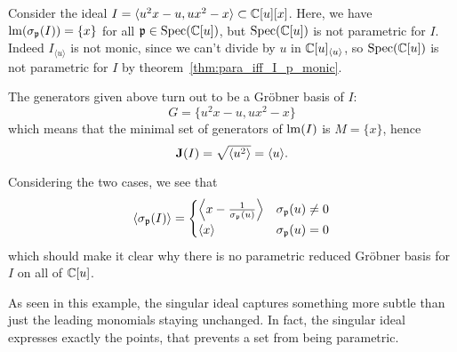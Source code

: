 \begin{example}\label{ex:u2x}\upshape
  Consider the ideal $I = \langle u^{2}x - u, ux^{2} - x \rangle \subset \mathbb{C}[u][x]$. Here, we have $\operatorname{lm}(\sigma_{\mathfrak p}(I)) = \{x\}$ for all $\mathfrak p \in \operatorname{Spec}(\mathbb{C}[u])$, but $\operatorname{Spec}(\mathbb{C}[u])$ is not parametric for $I$. Indeed $I_{\langle u \rangle}$ is not monic, since we can't divide by $u$ in $\mathbb{C}[u]_{\langle u \rangle}$, so $\operatorname{Spec}(\mathbb{C}[u])$ is not parametric for $I$ by theorem~\ref{thm:para_iff_I_p_monic}.

  The generators given above turn out to be a Gröbner basis of $I$:
  \[G = \{u^{2}x - u, ux^{2} - x\}\]
  which means that the minimal set of generators of $\operatorname{lm}(I)$ is $M = \{x\}$, hence
  \[\operatorname{\mathbf J}(I) = \sqrt{\langle u^{2} \rangle} = \langle u \rangle.\]

  Considering the two cases, we see that
  \[\langle \sigma_{\mathfrak p}(I) \rangle =
    \begin{cases}
      \left\langle x - \frac{1}{\sigma_{\mathfrak p}(u)} \right\rangle & \sigma_{\mathfrak p}(u) \neq 0 \\
      \langle x \rangle & \sigma_{\mathfrak p}(u) = 0
    \end{cases}
  \]
  which should make it clear why there is no parametric reduced Gröbner basis for $I$ on all of $\mathbb{C}[u]$.
\end{example}

As seen in this example, the singular ideal captures something more subtle than just the leading monomials staying unchanged. In fact, the singular ideal expresses exactly the points, that prevents a set from being parametric.

